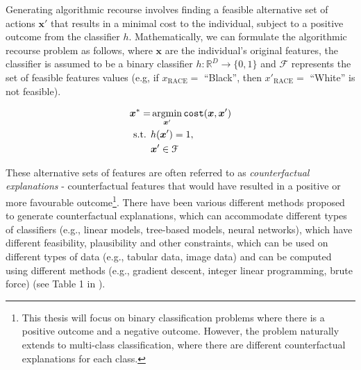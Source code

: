Generating algorithmic recourse involves finding a feasible alternative set of actions $\boldsymbol{x}'$ that results in a minimal cost to the individual, subject to a positive outcome from the classifier $h$. Mathematically, we can formulate the algorithmic recourse problem as follows, where $\boldsymbol{x}$ are the individual's original features, the classifier is assumed to be a binary classifier $h: \mathbb{R}^D \to \{0,1\}$ and $\mathcal{F}$ represents the set of feasible features values (e.g, if $x_{\text{RACE}}=$ ``Black'', then $x'_{\text{RACE}}=$ ``White'' is not feasible).

\begin{align}
	\boldsymbol{x}^* = & \operatorname*{argmin}_{\boldsymbol{x}'}  \texttt{cost}(\boldsymbol{x}, \boldsymbol{x}') \\ \nonumber
	\text{s.t. } & h(\boldsymbol{x}') = 1, \\ \nonumber
	& \boldsymbol{x}' \in \mathcal{F}
\end{align}


These alternative sets of features are often referred to as \textit{counterfactual explanations} - counterfactual features that would have resulted in a positive or more favourable outcome\footnote{This thesis will focus on binary classification problems where there is a positive outcome and a negative outcome. However, the problem naturally extends to multi-class classification, where there are different counterfactual explanations for each class.}. There have been various different methods proposed to generate counterfactual explanations, which can accommodate different types of classifiers (e.g., linear models, tree-based models, neural networks), which have different feasibility, plausibility and other constraints, which can be used on different types of data (e.g., tabular data, image data) and can be computed using different methods (e.g., gradient descent, integer linear programming, brute force) (see Table 1 in \textcite{karimiSurveyAlgorithmicRecourse2022}).\\

